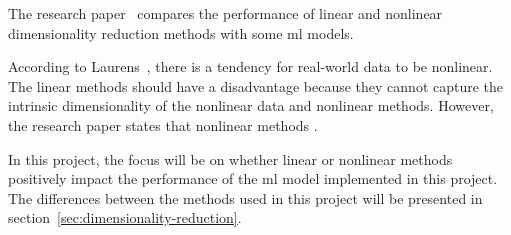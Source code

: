 The research paper~\cite{dimensionality-reduction-comparative-review} compares the performance of linear and nonlinear dimensionality reduction methods with some \gls{ml} models.

According to Laurens~\cite{dimensionality-reduction-comparative-review}, there is a tendency for real-world data to be nonlinear. The linear methods should have a disadvantage because they cannot capture the intrinsic dimensionality of the nonlinear data and nonlinear methods. However, the research paper states that nonlinear methods .

In this project, the focus will be on whether linear or nonlinear methods positively impact the performance of the \gls{ml} model implemented in this project. The differences between the methods used in this project will be presented in section~\ref{sec:dimensionality-reduction}.





